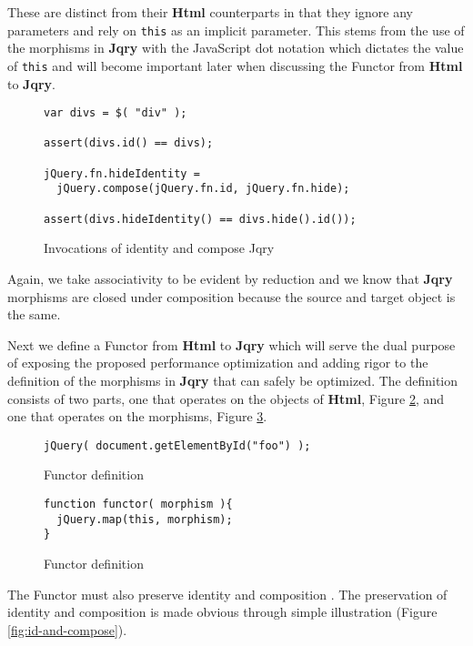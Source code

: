 \documentclass[preprint]{sigplanconf}
\begin{document}
These are distinct from their \textbf{Html} counterparts in that they ignore any parameters and rely on \verb|this| as an implicit parameter. This stems from the use of the morphisms in \textbf{Jqry} with the JavaScript dot notation which dictates the value of \verb|this| and will become important later when discussing the Functor from \textbf{Html} to \textbf{Jqry}.


\begin{figure}[!ht]
\small
\begin{verbatim}
var divs = $( "div" );

assert(divs.id() == divs);

jQuery.fn.hideIdentity =
  jQuery.compose(jQuery.fn.id, jQuery.fn.hide);

assert(divs.hideIdentity() == divs.hide().id());
\end{verbatim}
\nocaptionrule \caption{Invocations of identity and compose Jqry}
\label{fig:sample-jqry-compose}
\end{figure}

Again, we take associativity to be evident by reduction and we know that \textbf{Jqry} morphisms are closed under composition because the source and target object is the same.

Next we define a Functor from \textbf{Html} to \textbf{Jqry} which will serve the dual purpose of exposing the proposed performance optimization and adding rigor to the definition of the morphisms in \textbf{Jqry} that can safely be optimized. The definition consists of two parts, one that operates on the objects of \textbf{Html}, Figure \ref{fig:functor-for-object}, and one that operates on the morphisms, Figure \ref{fig:functor-for-morphism}.

\begin{figure}[!ht]
\small
\begin{verbatim}
jQuery( document.getElementById("foo") );
\end{verbatim}
\nocaptionrule \caption{Functor definition}
\label{fig:functor-for-object}
\end{figure}

\begin{figure}[!ht]
\small
\begin{verbatim}
function functor( morphism ){
  jQuery.map(this, morphism);
}
\end{verbatim}
\nocaptionrule \caption{Functor definition}
\label{fig:functor-for-morphism}
\end{figure}

The Functor must also preserve identity and composition \cite[p. ~36]{bib:category-definition}. The preservation of identity and composition is made obvious through simple illustration (Figure \ref{fig:id-and-compose}).
\end{document}
